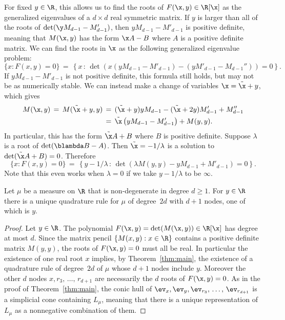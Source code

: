 \begin{rema}\label{rem:GenEigBilinear}
For fixed $y\in \R$, this allows us to find the roots of $F(\x,y)\in \R[\x]$ as the generalized eigenvalues of a $d\times d$ real symmetric matrix. If $y$ is larger than all of the roots of $\det(\y M_{d-1} - M'_{d-1})$, then $yM_{d-1} - M'_{d-1}$ is positive definite, meaning that $M(\x,y)$ has the form $\x A-B$ where $A$ is a positive definite matrix. We can find the roots in $\x$ as the following generalized eigenvalue problem:
\[
\{x : F(x,y)=0\} \, = \, \left\{ x \, : \, \det\left(x\left(yM_{d-1} - M'_{d-1}\right) - \left(yM'_{d-1} -M_{d-1}''\right)\right)=0\right\}.
\]
If $yM_{d-1} - M'_{d-1}$ is not positive definite, this formula still holds, but may not be as numerically stable. We can instead make a change of variables $\x=\tilde{\x}+y$, which gives
\begin{align*}
M(\x,y) \, = \, M(\tilde{\x}+y,y) &\, = \, (\tilde{\x}+y)yM_{d-1}-(\tilde{\x}+2y)M'_{d-1}+ M''_{d-1} \\
& \, = \, \tilde{\x}\left(yM_{d-1} - M'_{d-1}\right) + M(y,y).
\end{align*}
In particular, this has the form $\tilde{\x}A+B$ where $B$ is positive definite. Suppose $\lambda$ is a root of $\det(\blambda B- A)$. Then $\tilde{\x}=-1/\lambda$ is a solution to $\det(\tilde{\x}A+B)=0$. Therefore
\[
\{x : F(x,y)=0\} \, = \, \left\{ y-1/\lambda \, : \, \det\left(\lambda M(y,y) - yM_{d-1} + M'_{d-1}\right)=0\right\}.
\]
Note that this even works when $\lambda = 0$ if we take $y-1/\lambda$ to be $\infty$.
\end{rema}

\begin{coro}\label{cor:Uniqueness}
Let $\mu$ be a measure on $\R$ that is non-degenerate in degree $d\geq1$. For $y\in \R$ there is a unique quadrature rule for $\mu$ of degree~$2d$ with $d+1$ nodes, one of which is $y$.
\end{coro}

\begin{proof}
Let $y\in \R$. The polynomial $F(\x,y) = \det(M(\x,y)) \in \R[\x]$ has degree at most $d$. Since the matrix pencil $\{M(x,y): x\in \R\}$ contains a positive definite matrix $M(y,y)$, the roots of $F(\x,y)=0$ must all be real. In particular the existence of one real root $x$ implies, by Theorem~\ref{thm:main}, the existence of a quadrature rule of degree~$2d$ of $\mu$ whose $d+1$ nodes include $y$. Moreover the other $d$ nodes $x, r_3,\,\hdots,\,r_{d+1}$ are necessarily the $d$ roots of $F(\x,y)=0$. As in the proof of Theorem~\ref{thm:main}, the conic hull of $\ev_x, \ev_y, \ev_{r_3},\,\hdots,\,\ev_{r_{d+1}}$ is a simplicial cone containing $L_{\mu}$, meaning that there is a unique representation of $L_{\mu}$ as a nonnegative combination of them.
\end{proof}


